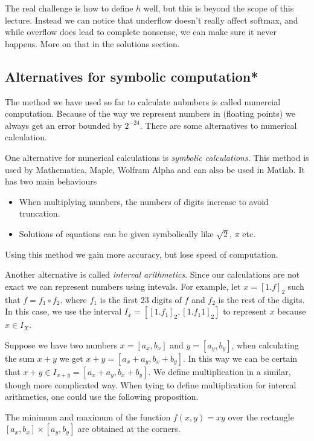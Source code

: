 \documentclass[11pt,a4paper]{article}
\begin{document}
The real challenge is how to define $h$ well,
but this is beyond the scope of this lecture.
Instead we can notice that underflow doesn't really affect softmax,
and while overflow does lead to complete nonsense,
we can make sure it never happens.
More on that in the solutions section.

\subsection{Alternatives for symbolic computation*}

The method we have used so far to calculate nubmbers is called numercial
computation.
Because of the way we represent numbers in (floating points) we always
get an error bounded by $2^{-24}$.
There are some alternatives to numerical calculation.

One alternative for numerical calculations is \emph{symbolic calculations}.
This method is used by Mathematica, Maple, Wolfram Alpha 
and can also be used in Matlab.
It has two main behaviours
\begin{itemize}
  \item When multiplying numbers, the numbers of digits increase to avoid
    truncation.
  \item Solutions of equations can be given symbolically like $\sqrt{2}$,
    $\pi$ etc.
\end{itemize}
Using this method we gain more accuracy, but lose speed of computation.

Another alternative is called \emph{interval arithmetics}.
Since our calculations are not exact we can represent numbers using intevals.
For example, let $x = [1.f]_2$ such that $f = f_1 \circ f_2$.
where $f_1$ is the first 23 digits of $f$ and $f_2$ is the rest of the digits.
In this case, we use the interval $I_x = [[1.f_1]_2,[1.f_1 1]_2]$ to represent
$x$ because $x \in I_X$.

Suppose we have two numbers $x = [a_x, b_x]$ and $y = [a_y, b_y]$, when
calculating the sum $x + y$ we get $x + y = [a_x + a_y, b_x + b_y]$.
In this way we can be certain that
$x + y \in I_{x+y} = [a_x + a_y, b_x + b_y]$.
We define multiplication in a similar, though more complicated way.
When tying to define multiplication for intercal arithmetics, one could
use the following proposition.

\begin{proposition}
  The minimum and maximum of the function $f(x, y) = xy$ over
  the rectangle $[a_x, b_x] \times [a_y, b_y]$ are obtained at the corners. 
\end{proposition}
\end{document}
